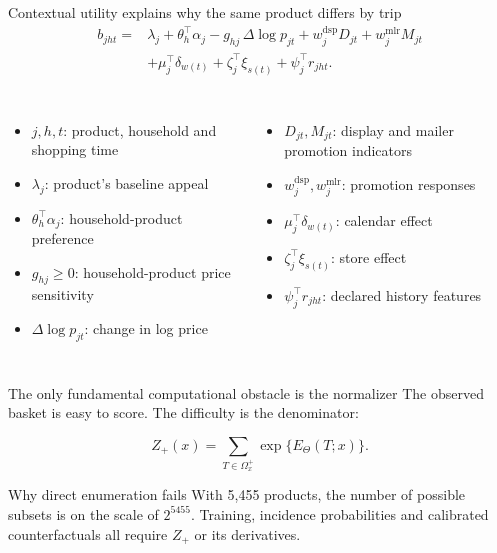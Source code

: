 \documentclass[aspectratio=169,11pt,t]{beamer}
\begin{document}
\begin{frame}{Contextual utility explains why the same product differs by trip}
\small
\[
\begin{aligned}
b_{jht}={}&\lambda_j+\theta_h^{\top}\alpha_j
-g_{hj}\,\Delta\log p_{jt}
+w_j^{\mathrm{dsp}}D_{jt}+w_j^{\mathrm{mlr}}M_{jt}\\
&+\mu_j^{\top}\delta_{w(t)}
+\zeta_j^{\top}\xi_{s(t)}
+\psi_j^{\top}r_{jht}.
\end{aligned}
\]

\begin{columns}[T,onlytextwidth]
  \begin{itemize}
    \item $j,h,t$: product, household and shopping time
    \item $\lambda_j$: product's baseline appeal
    \item $\theta_h^{\top}\alpha_j$: household-product preference
    \item $g_{hj}\ge0$: household-product price sensitivity
    \item $\Delta\log p_{jt}$: change in log price
  \end{itemize}

  \begin{itemize}
    \item $D_{jt},M_{jt}$: display and mailer promotion indicators
    \item $w_j^{\mathrm{dsp}},w_j^{\mathrm{mlr}}$: promotion responses
    \item $\mu_j^{\top}\delta_{w(t)}$: calendar effect
    \item $\zeta_j^{\top}\xi_{s(t)}$: store effect
    \item $\psi_j^{\top}r_{jht}$: declared history features
  \end{itemize}
\end{columns}
\end{frame}

\begin{frame}{The only fundamental computational obstacle is the normalizer}
\small
The observed basket is easy to score. The difficulty is the denominator:

\[
Z_{+}(x)=\sum_{T\in\Omega_x^{+}}\exp\{E_{\Theta}(T;x)\}.
\]

\begin{center}
\begin{minipage}{0.82\textwidth}
\begin{block}{Why direct enumeration fails}
With 5,455 products, the number of possible subsets is on the scale of $2^{5455}$.
Training, incidence probabilities and calibrated counterfactuals all require $Z_{+}$ or
its derivatives.
\end{block}
\end{minipage}
\end{center}

\end{frame}
\end{document}
